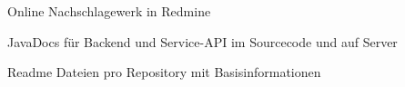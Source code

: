 \begin{frame}
\begin{block}{}
	Online Nachschlagewerk in Redmine
\end{block}
\begin{block}{}
	JavaDocs für Backend und Service-API im Sourcecode und auf Server
\end{block}
\begin{block}{}
	Readme Dateien pro Repository mit Basisinformationen
\end{block}
\end{frame}